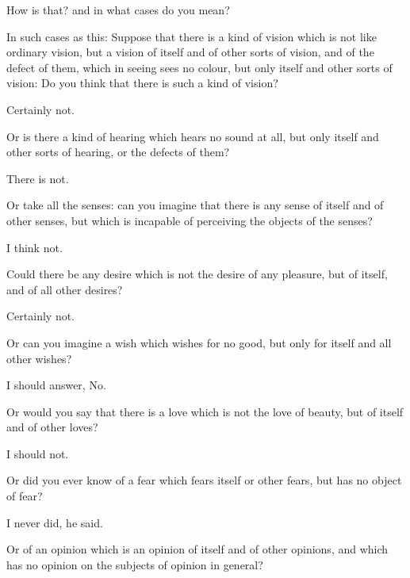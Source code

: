 \documentclass[11pt,letter]{article}
\begin{document}
\par  How is that? and in what cases do you mean?

\par  In such cases as this: Suppose that there is a kind of vision which is not like ordinary vision, but a vision of itself and of other sorts of vision, and of the defect of them, which in seeing sees no colour, but only itself and other sorts of vision: Do you think that there is such a kind of vision?

\par  Certainly not.

\par  Or is there a kind of hearing which hears no sound at all, but only itself and other sorts of hearing, or the defects of them?

\par  There is not.

\par  Or take all the senses: can you imagine that there is any sense of itself and of other senses, but which is incapable of perceiving the objects of the senses?

\par  I think not.

\par  Could there be any desire which is not the desire of any pleasure, but of itself, and of all other desires?

\par  Certainly not.

\par  Or can you imagine a wish which wishes for no good, but only for itself and all other wishes?

\par  I should answer, No.

\par  Or would you say that there is a love which is not the love of beauty, but of itself and of other loves?

\par  I should not.

\par  Or did you ever know of a fear which fears itself or other fears, but has no object of fear?

\par  I never did, he said.

\par  Or of an opinion which is an opinion of itself and of other opinions, and which has no opinion on the subjects of opinion in general?
\end{document}
